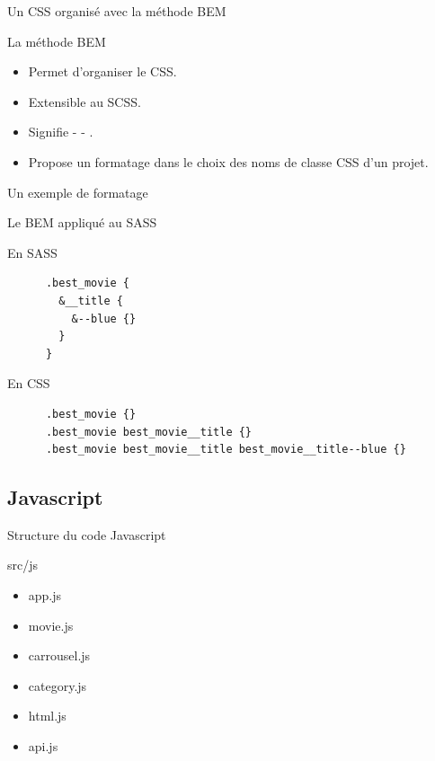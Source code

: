 \begin{frame}[fragile]{Un CSS organisé avec la méthode BEM}
  
  \begin{block}{La méthode BEM}
    \begin{itemize}
    \item Permet d'organiser le CSS.
    \item Extensible au SCSS.
    \item Signifie {} - {} - {}.
    \item Propose un formatage dans le choix des noms de classe CSS d'un projet.
    \end{itemize}    
  \end{block}

  \begin{block}{Un exemple de formatage}
    \textsc{\color{red}{nom\_bloc} \color{violet}{\_ \_ nom\_element} \color{teal}{- - nom\_modifier}}
  \end{block}
\end{frame}

\begin{frame}[fragile]{Le BEM appliqué au SASS}
  \begin{block}{En SASS}
    \scriptsize
    \begin{verbatim}
      .best_movie {
        &__title {
          &--blue {}
        }
      }
    \end{verbatim}
  \end{block}

  \begin{block}{En CSS}
    \scriptsize
    \begin{verbatim}
      .best_movie {}
      .best_movie best_movie__title {}
      .best_movie best_movie__title best_movie__title--blue {}
    \end{verbatim}
  \end{block}
\end{frame}

\subsection{Javascript}
\begin{frame}{Structure du code Javascript}
  \begin{block}{src/js}
    \begin{itemize}
    \item app.js
    \item movie.js
    \item carrousel.js
    \item category.js
    \item html.js
    \item api.js
    \end{itemize}
  \end{block}
\end{frame}

